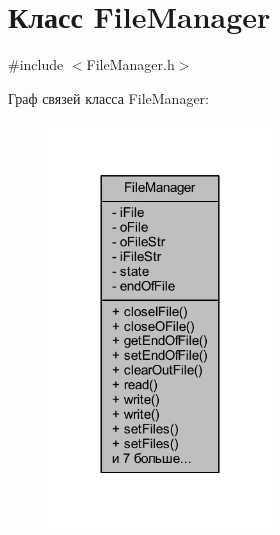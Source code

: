 \hypertarget{class_file_manager}{}\section{Класс File\+Manager}
\label{class_file_manager}


{\ttfamily \#include $<$File\+Manager.\+h$>$}



Граф связей класса File\+Manager\+:\nopagebreak
\begin{figure}[H]
\begin{center}
\leavevmode
\includegraphics[width=168pt]{class_file_manager__coll__graph}
\end{center}
\end{figure}
